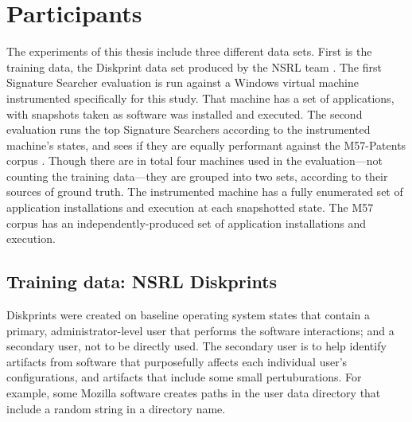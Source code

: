 \documentclass[11pt]{ucthesis}
\theoremstyle{plain}
\theoremstyle{definition}
\begin{document}
\section{Participants}

The experiments of this thesis include three different data sets.  First is the training data, the Diskprint data set produced by the NSRL team \cite{white:aafs14}.  The first Signature Searcher evaluation is run against a Windows virtual machine instrumented specifically for this study.  That machine has a set of applications, with snapshots taken as software was installed and executed.  The second evaluation runs the top Signature Searchers according to the instrumented machine's states, and sees if they are equally performant against the M57-Patents corpus \cite{woods:adfsl11}.  Though there are in total four machines used in the evaluation---not counting the training data---they are grouped into two sets, according to their sources of ground truth.  The instrumented machine has a fully enumerated set of application installations and execution at each snapshotted state.  The M57 corpus has an independently-produced set of application installations and execution.


\subsection{Training data: NSRL Diskprints}

Diskprints were created on baseline operating system states that contain a primary, administrator-level user that performs the software interactions; and a secondary user, not to be directly used.  The secondary user is to help identify artifacts from software that purposefully affects each individual user's configurations, and artifacts that include some small pertuburations.  For example, some Mozilla software creates paths in the user data directory that include a random string in a directory name.
\end{document}

